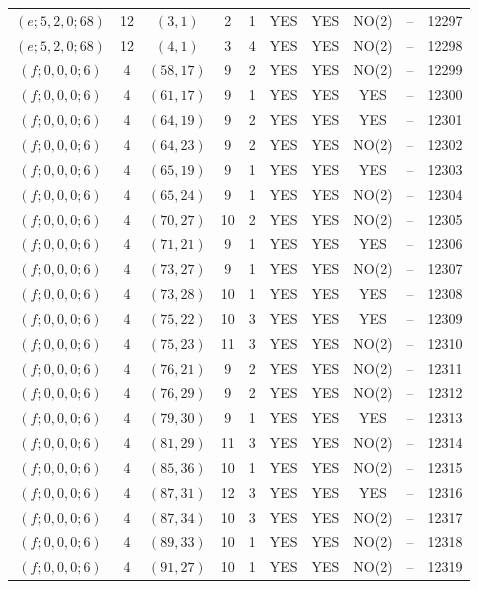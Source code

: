 \begin{longtable}{|c|c|c|c|c|c|c|c|c|c|}
$(e; 5, 2, 0; 68)$ & 12 & $(3, 1)$ & 2 & 1 & YES & YES & NO(2) & -- & 12297\\
$(e; 5, 2, 0; 68)$ & 12 & $(4, 1)$ & 3 & 4 & YES & YES & NO(2) & -- & 12298\\
$(f; 0, 0, 0; 6)$ & 4 & $(58, 17)$ & 9 & 2 & YES & YES & NO(2) & -- & 12299\\
$(f; 0, 0, 0; 6)$ & 4 & $(61, 17)$ & 9 & 1 & YES & YES & YES & -- & 12300\\
$(f; 0, 0, 0; 6)$ & 4 & $(64, 19)$ & 9 & 2 & YES & YES & YES & -- & 12301\\
$(f; 0, 0, 0; 6)$ & 4 & $(64, 23)$ & 9 & 2 & YES & YES & NO(2) & -- & 12302\\
$(f; 0, 0, 0; 6)$ & 4 & $(65, 19)$ & 9 & 1 & YES & YES & YES & -- & 12303\\
$(f; 0, 0, 0; 6)$ & 4 & $(65, 24)$ & 9 & 1 & YES & YES & NO(2) & -- & 12304\\
$(f; 0, 0, 0; 6)$ & 4 & $(70, 27)$ & 10 & 2 & YES & YES & NO(2) & -- & 12305\\
$(f; 0, 0, 0; 6)$ & 4 & $(71, 21)$ & 9 & 1 & YES & YES & YES & -- & 12306\\
$(f; 0, 0, 0; 6)$ & 4 & $(73, 27)$ & 9 & 1 & YES & YES & NO(2) & -- & 12307\\
$(f; 0, 0, 0; 6)$ & 4 & $(73, 28)$ & 10 & 1 & YES & YES & YES & -- & 12308\\
$(f; 0, 0, 0; 6)$ & 4 & $(75, 22)$ & 10 & 3 & YES & YES & YES & -- & 12309\\
$(f; 0, 0, 0; 6)$ & 4 & $(75, 23)$ & 11 & 3 & YES & YES & NO(2) & -- & 12310\\
$(f; 0, 0, 0; 6)$ & 4 & $(76, 21)$ & 9 & 2 & YES & YES & NO(2) & -- & 12311\\
$(f; 0, 0, 0; 6)$ & 4 & $(76, 29)$ & 9 & 2 & YES & YES & NO(2) & -- & 12312\\
$(f; 0, 0, 0; 6)$ & 4 & $(79, 30)$ & 9 & 1 & YES & YES & YES & -- & 12313\\
$(f; 0, 0, 0; 6)$ & 4 & $(81, 29)$ & 11 & 3 & YES & YES & NO(2) & -- & 12314\\
$(f; 0, 0, 0; 6)$ & 4 & $(85, 36)$ & 10 & 1 & YES & YES & NO(2) & -- & 12315\\
$(f; 0, 0, 0; 6)$ & 4 & $(87, 31)$ & 12 & 3 & YES & YES & YES & -- & 12316\\
$(f; 0, 0, 0; 6)$ & 4 & $(87, 34)$ & 10 & 3 & YES & YES & NO(2) & -- & 12317\\
$(f; 0, 0, 0; 6)$ & 4 & $(89, 33)$ & 10 & 1 & YES & YES & NO(2) & -- & 12318\\
$(f; 0, 0, 0; 6)$ & 4 & $(91, 27)$ & 10 & 1 & YES & YES & NO(2) & -- & 12319\\

\end{longtable}
